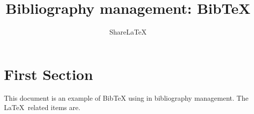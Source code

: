 \documentclass[a4paper,10pt]{article}
\title{Bibliography management: BibTeX}
\author{Share\LaTeX}
\begin{document}
\maketitle

\tableofcontents

\medskip

\section{First Section}
This document is an example of BibTeX using in bibliography management. The \LaTeX\ related items are. \cite{patchkovskii_2017}

\medskip



\end{document}
